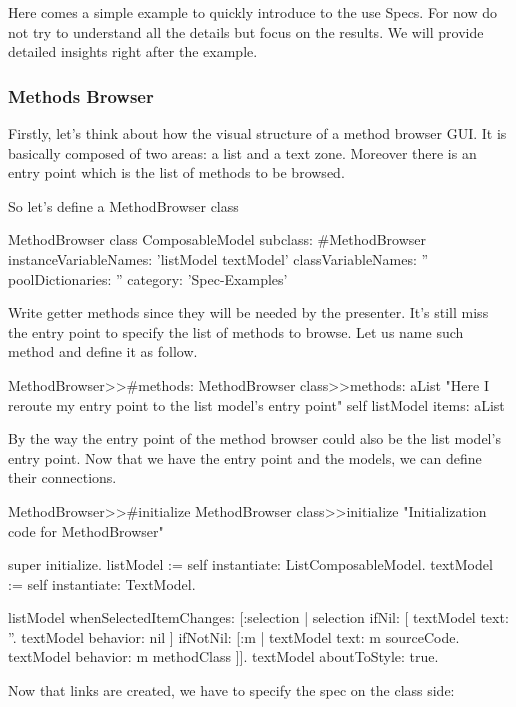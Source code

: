 \documentclass[a4paper,10pt,twoside]{book}
\begin{document}
Here comes a simple example to quickly introduce to the use Specs. For now do not try to understand all the details but focus on the results. We will provide detailed insights right after the example.

\subsubsection{Methods Browser}

Firstly, let's think about how the visual structure of a method browser GUI. It is basically composed of two areas: a list and a text zone. Moreover there is an entry point which is the list of methods to be browsed.

So let's define a MethodBrowser class

\begin{classdef}{MethodBrowser class}
ComposableModel subclass: #MethodBrowser
	instanceVariableNames: 'listModel textModel'
	classVariableNames: ''
	poolDictionaries: ''
	category: 'Spec-Examples'
\end{classdef}

Write getter methods since they will be needed by the presenter. It's still miss the entry point to specify the list of methods to browse. Let us name such method  and define it as follow.  

\begin{method}{MethodBrowser>>\#methods:}
MethodBrowser class>>methods: aList
	"Here I reroute my entry point to the list model's entry point"
	self listModel items: aList
\end{method}
By the way the entry point of the method browser could also be the list model's entry point.
Now that we have the entry point and the models, we can define their connections.

\begin{method}{MethodBrowser>>\#initialize}
MethodBrowser class>>initialize
	"Initialization code for MethodBrowser"

	super initialize.
	listModel := self instantiate: ListComposableModel.
	textModel := self instantiate: TextModel.
		
	listModel whenSelectedItemChanges: [:selection |
		selection
			ifNil: [
				textModel text: ''.
				textModel behavior: nil ]
			ifNotNil: [:m | 
				textModel text: m sourceCode.
				textModel behavior: m methodClass ]].
	textModel aboutToStyle: true.
\end{method}

Now that links are created, we have to specify the spec on the class side:
\end{document}
